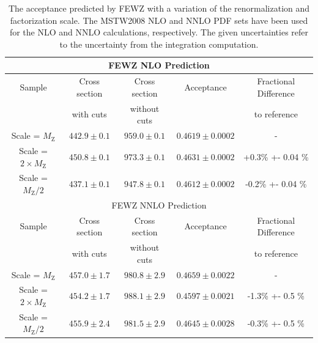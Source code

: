 \documentclass{cmspaper}
\begin{document}

\begin{table}[!ht]
\begin{center}
\begin{tabular}{|c|c|c|c|c|}
\hline
\multicolumn{5}{|c|}{FEWZ NLO Prediction} \\
\hline
Sample &  Cross section & Cross section & Acceptance & Fractional Difference\\
       &  with cuts & without cuts &  & to reference\\
\hline 
Scale = $M_{\mathrm{Z}}$                   & $442.9 \pm 0.1$   & $959.0 \pm 0.1$  & $0.4619 \pm 0.0002$  & - \\
Scale = $2\times M_{\mathrm{Z}}$           & $450.8 \pm 0.1$   & $973.3 \pm 0.1$  & $0.4631 \pm 0.0002$  & +0.3\% +- 0.04 \%\\
Scale = $M_{\mathrm{Z}} / 2$               & $437.1 \pm 0.1$   & $947.8 \pm 0.1$  & $0.4612 \pm 0.0002$  & -0.2\% +- 0.04 \%\\
\hline 
\multicolumn{5}{|c|}{FEWZ NNLO Prediction} \\
\hline
Sample &  Cross section & Cross section & Acceptance & Fractional Difference\\
       &  with cuts & without cuts &  & to reference\\
\hline
Scale =  $M_{\mathrm{Z}}$                  & $457.0 \pm 1.7$   & $980.8 \pm 2.9$  & $0.4659 \pm 0.0022$  & - \\
Scale = $2\times M_{\mathrm{Z}}$           & $454.2 \pm 1.7$   & $988.1 \pm 2.9$  & $0.4597 \pm 0.0021$  & -1.3\% +- 0.5 \%\\
Scale = $M_{\mathrm{Z}} / 2$               & $455.9 \pm 2.4$   & $981.5 \pm 2.9$  & $0.4645 \pm 0.0028$  & -0.3\% +- 0.5 \%\\
\hline
\end{tabular}
\caption{The acceptance predicted by FEWZ with a variation of the renormalization and factorization scale. The MSTW2008 NLO and NNLO PDF sets have been used for the NLO and NNLO calculations, respectively. The given uncertainties refer to the uncertainty from the integration computation. \label{tab:FEWZScaleVariation}}
\end{center}
\end{table}
\end{document}
